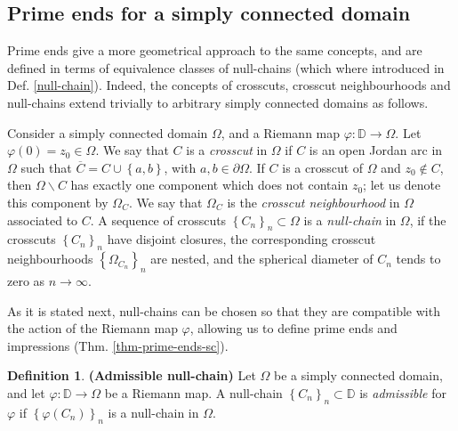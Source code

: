 \documentclass[11pt,a4paper,reqno]{amsart}
\theoremstyle{plain}
\theoremstyle{definition}
\newtheorem{defi}[thm]{Definition}
\theoremstyle{plain}
\begin{document}
\subsection*{Prime ends for a simply connected domain}
Prime ends give a more geometrical approach to the same concepts, and are defined in terms of equivalence classes of null-chains (which where introduced in Def. \ref{null-chain}). Indeed, the concepts of crosscuts, crosscut neighbourhoods and null-chains extend trivially to arbitrary simply connected domains as follows. 

Consider a simply connected domain $ \Omega $, and a Riemann map $ \varphi\colon\mathbb{D}\to\Omega $. Let 
 $\varphi(0)= z_0\in \Omega $. We say that $ C $ is a \textit{crosscut} in $ \Omega $ if $ C $ is an open Jordan arc in $ \Omega $ such that $ \overline{C}=C\cup \left\lbrace a,b\right\rbrace  $, with $ a,b\in \partial \Omega $. If $ C $ is a crosscut of $ \Omega $ and  $ z_0\notin C $, then $ \Omega\smallsetminus C $ has exactly one component which does
 not contain $ z_0 $; let us denote this component by $ \Omega_C $. We say that $ \Omega_C $ is the \textit{crosscut neighbourhood} in $ \Omega $ associated to $ C$.  A sequence of crosscuts $ \left\lbrace C_n\right\rbrace _n \subset \Omega$ is a {\em null-chain} in $ \Omega $, if the crosscuts $ \left\lbrace C_n\right\rbrace _n $ have disjoint closures, the corresponding crosscut neighbourhoods $ \left\lbrace \Omega_{C_n}\right\rbrace _n $  are nested, and  the spherical diameter of $ C_n $ tends to zero as $ n\to\infty $. 

As it is stated next, null-chains can be chosen so that they are compatible with the action of the Riemann map $ \varphi $, allowing us to define prime ends and impressions (Thm. \ref{thm-prime-ends-sc}).

\begin{defi}{\bf (Admissible null-chain)}
		Let $ \Omega $ be a simply connected domain, and let $ \varphi\colon\mathbb{D}\to\Omega $ be a Riemann map. A null-chain $ \left\lbrace C_n\right\rbrace _n \subset \mathbb{D}$ is {\em admissible} for $ \varphi $ if $ \left\lbrace \varphi(C_n)\right\rbrace _n $ is a null-chain in $ \Omega $.
\end{defi}
\end{document}
